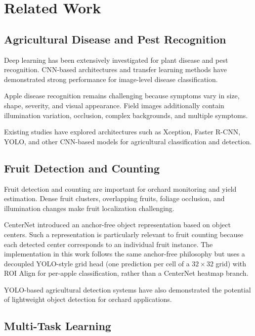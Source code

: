 \documentclass[preprint,12pt]{elsarticle}
\begin{document}
\section{Related Work}
\label{sec:related}

\subsection{Agricultural Disease and Pest Recognition}

Deep learning has been extensively investigated for plant disease and
pest recognition. CNN-based architectures and transfer learning methods
have demonstrated strong performance for image-level disease
classification.

Apple disease recognition remains challenging because symptoms vary in
size, shape, severity, and visual appearance. Field images additionally
contain illumination variation, occlusion, complex backgrounds, and
multiple symptoms.

Existing studies have explored architectures such as Xception,
Faster R-CNN, YOLO, and other CNN-based models for agricultural
classification and detection.

\subsection{Fruit Detection and Counting}

Fruit detection and counting are important for orchard monitoring and
yield estimation. Dense fruit clusters, overlapping fruits, foliage
occlusion, and illumination changes make fruit localization challenging.

CenterNet introduced an anchor-free object representation based on
object centers. Such a representation is particularly relevant to fruit
counting because each detected center corresponds to an individual fruit
instance. The implementation in this work follows the same anchor-free
philosophy but uses a decoupled YOLO-style grid head (one prediction per
cell of a $32\times32$ grid) with ROI Align for per-apple classification,
rather than a CenterNet heatmap branch.

YOLO-based agricultural detection systems have also demonstrated the
potential of lightweight object detection for orchard applications.

\subsection{Multi-Task Learning}
\end{document}
